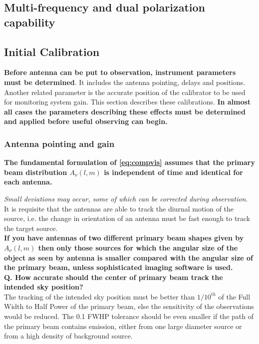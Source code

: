 \documentclass[10pt]{report}
\newcommand{\tbf}[1]{\textbf{#1}}
\newcommand{\tit}[1]{\textit{#1}}
\begin{document}
\subsection{Multi-frequency and dual polarization capability}
\subsection{Initial Calibration}
\tbf{Before antenna can be put to observation, instrument parameters must be determined}. It includes the antenna pointing, delays and positions. Another related parameter is the accurate position of the calibrator to be used for monitoring system gain. This section describes these calibrations. \tbf{In almost all cases the parameters describing these effects must be determined and applied before useful observing can begin.}
\subsubsection{Antenna pointing and gain}
\tbf{The fundamental formulation of \eqref{eq:compvis} assumes that the primary beam distribution $A_\nu(l,m)$  is independent of time and identical for each antenna.}\

\tit{Small deviations may occur, some of which can be corrected during observation}.\\

It is requisite that the antennas are able to track the diurnal motion of the source, i.e. the change in orientation of an antenna must be fast enough to track the target source. \\

\tbf{If you have antennas of two different primary beam shapes given by $A_\nu(l,m)$ then only those sources for which the angular size of the object as seen by antenna is smaller compared with the angular size of the primary beam, unless sophisticated imaging software is used.}\\

\tbf{Q. How accurate should the center of primary beam track the intended sky position?}\\
The tracking of the intended sky position must be better than $1/10^{th}$ of the Full Width to Half Power of the primary beam, else the sensitivity of the observations would be reduced. The 0.1 FWHP tolerance should be even smaller if the path of the primary beam contains emission, either from one large diameter source or from a high density of background source.\\
\end{document}

